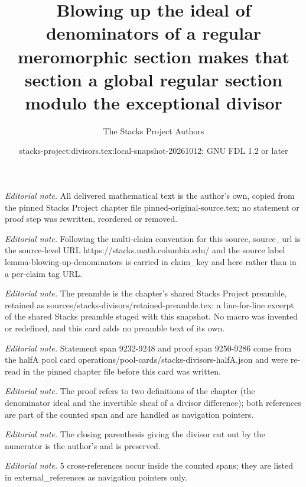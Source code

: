 \documentclass[10pt,a4paper]{amsart}
\title{Blowing up the ideal of denominators of a regular meromorphic section makes that section a global regular section modulo the exceptional divisor}
\author{The Stacks Project Authors}
\date{stacks-project:divisors.tex:local-snapshot-20261012; GNU FDL 1.2 or later}
\theoremstyle{plain}
\theoremstyle{definition}
\theoremstyle{remark}
\numberwithin{equation}{subsection}
\begin{document}
\maketitle
\noindent\textit{Editorial note.} All delivered mathematical text is the author's own, copied from the pinned Stacks Project chapter file pinned-original-source.tex; no statement or proof step was rewritten, reordered or removed.\par\medskip
\noindent\textit{Editorial note.} Following the multi-claim convention for this source, source\_url is the source-level URL https://stacks.math.columbia.edu/ and the source label lemma-blowing-up-denominators is carried in claim\_key and here rather than in a per-claim tag URL.\par\medskip
\noindent\textit{Editorial note.} The preamble is the chapter's shared Stacks Project preamble, retained as sources/stacks-divisors/retained-preamble.tex: a line-for-line excerpt of the shared Stacks preamble staged with this snapshot. No macro was invented or redefined, and this card adds no preamble text of its own.\par\medskip
\noindent\textit{Editorial note.} Statement span 9232-9248 and proof span 9250-9286 come from the halfA pool card operations/pool-cards/stacks-divisors-halfA.json and were re-read in the pinned chapter file before this card was written.\par\medskip
\noindent\textit{Editorial note.} The proof refers to two definitions of the chapter (the denominator ideal and the invertible sheaf of a divisor difference); both references are part of the counted span and are handled as navigation pointers.\par\medskip
\noindent\textit{Editorial note.} The closing parenthesis giving the divisor cut out by the numerator is the author's and is preserved.\par\medskip
\noindent\textit{Editorial note.} 5 cross-references occur inside the counted spans; they are listed in external\_references as navigation pointers only.\par\medskip
\end{document}
